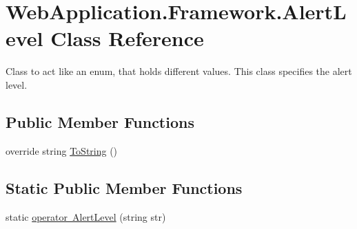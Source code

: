 \hypertarget{classWebApplication_1_1Framework_1_1AlertLevel}{}\section{Web\+Application.\+Framework.\+Alert\+Level Class Reference}
\label{classWebApplication_1_1Framework_1_1AlertLevel}


Class to act like an enum, that holds different values. This class specifies the alert level.  


\subsection*{Public Member Functions}
\begin{DoxyCompactItemize}
\item 
override string \mbox{\hyperlink{classWebApplication_1_1Framework_1_1AlertLevel_ac61b4db00d547e0117ca241424a8cdca}{To\+String}} ()
\end{DoxyCompactItemize}
\subsection*{Static Public Member Functions}
\begin{DoxyCompactItemize}
\item 
static \mbox{\hyperlink{classWebApplication_1_1Framework_1_1AlertLevel_ad78741adbb8b8309ab8cae9e252bb88b}{operator Alert\+Level}} (string str)
\end{DoxyCompactItemize}
